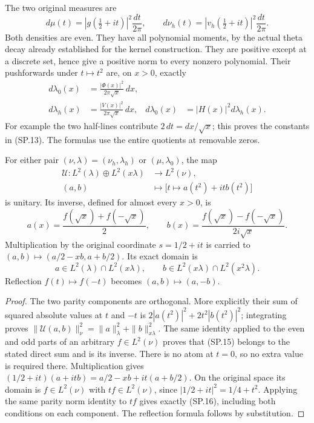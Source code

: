 The two original measures are
\[
 d\mu(t)=|g(\tfrac12+it)|^2\frac{dt}{2\pi},\qquad
 d\nu_h(t)=|v_h(\tfrac12+it)|^2\frac{dt}{2\pi}.
 \tag{SP.12}
\]
Both densities are even. They have all polynomial moments, by the
actual theta decay already established for the kernel construction.
They are positive except at a discrete set, hence give a positive
norm to every nonzero polynomial. Their pushforwards under
\(t\mapsto t^2\) are, on \(x>0\), exactly
\[
 \begin{aligned}
 d\lambda_0(x)&=\frac{|\Phi(x)|^2}{2\pi\sqrt x}\,dx,\\
 d\lambda_h(x)&=\frac{|V(x)|^2}{2\pi\sqrt x}\,dx,
 &d\lambda_0(x)&=|H(x)|^2d\lambda_h(x).
 \end{aligned}
 \tag{SP.13}
\]
For example the two half-lines contribute
\(2\,dt=dx/\sqrt x\); this proves the constants in (SP.13).
The formulas use the entire quotients at removable zeros.

\begin{theorem}
For either pair \((\nu,\lambda)=(\nu_h,\lambda_h)\) or
\((\mu,\lambda_0)\), the map
\[
 \begin{aligned}
 \mathcal U:L^2(\lambda)\oplus L^2(x\lambda)&\longrightarrow L^2(\nu),\\
 (a,b)&\longmapsto\bigl[t\mapsto a(t^2)+itb(t^2)\bigr]
 \end{aligned}
 \tag{SP.14}
\]
is unitary. Its inverse, defined for almost every \(x>0\), is
\[
 a(x)=\frac{f(\sqrt x)+f(-\sqrt x)}2,\qquad
 b(x)=\frac{f(\sqrt x)-f(-\sqrt x)}{2i\sqrt x}.
 \tag{SP.15}
\]
Multiplication by the original coordinate \(s=1/2+it\) is carried
to \((a,b)\mapsto(a/2-xb,a+b/2)\). Its exact domain is
\[
 a\in L^2(\lambda)\cap L^2(x\lambda),\qquad
 b\in L^2(x\lambda)\cap L^2(x^2\lambda).
 \tag{SP.16}
\]
Reflection \(f(t)\mapsto f(-t)\) becomes \((a,b)\mapsto(a,-b)\).
\end{theorem}

\begin{proof}
The two parity components are orthogonal. More explicitly their
sum of squared absolute values at \(t\) and \(-t\) is
\(2|a(t^2)|^2+2t^2|b(t^2)|^2\); integrating proves
\(\|\mathcal U(a,b)\|_\nu^2=\|a\|_\lambda^2+\|b\|_{x\lambda}^2\).
The same identity applied to the even and odd parts of an arbitrary
\(f\in L^2(\nu)\) proves that (SP.15) belongs to the stated direct
sum and is its inverse. There is no atom at \(t=0\), so no extra
value is required there. Multiplication gives
\((1/2+it)(a+itb)=a/2-xb+it(a+b/2)\). On the original space its
domain is \(f\in L^2(\nu)\) with \(tf\in L^2(\nu)\), since
\(|1/2+it|^2=1/4+t^2\). Applying the same parity norm identity to
\(tf\) gives exactly (SP.16), including both conditions on each
component. The reflection formula follows by substitution.
\end{proof}

